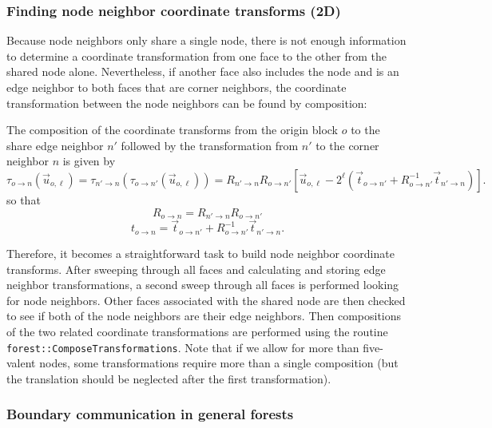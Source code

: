 \documentclass{article}
\begin{document}
\subsubsection{Finding node neighbor coordinate transforms (2D)}
Because node neighbors only share a single node, there is not enough information to determine a coordinate transformation from one face to the other from the shared node alone. Nevertheless, if another face also includes the node and is an edge neighbor to both faces that are corner neighbors, the coordinate transformation between the node neighbors can be found by composition:
\begin{center}

\end{center}
The composition of the coordinate transforms from the origin block $o$ to the share edge neighbor $n'$ followed by the transformation from $n'$ to the corner neighbor $n$ is given by
\begin{equation}
\tau_{o \rightarrow n}(\vec{u}_{o, \ell}) = 
\tau_{n' \rightarrow n}(\tau_{o \rightarrow n'}(\vec{u}_{o, \ell})) = 
R_{n' \rightarrow n} R_{o \rightarrow n'} 
[\vec{u}_{o, \ell} - 2^\ell (\vec{t}_{o \rightarrow n'} + R_{o \rightarrow n'}^{-1}\vec{t}_{n' \rightarrow n})].
\end{equation}
so that 
\begin{equation}
R_{o \rightarrow n} = R_{n' \rightarrow n} R_{o \rightarrow n'} 
\end{equation}
\begin{equation}
t_{o \rightarrow n} = \vec{t}_{o \rightarrow n'} 
+ R_{o \rightarrow n'}^{-1}\vec{t}_{n' \rightarrow n}.
\end{equation}

Therefore, it becomes a straightforward task to build node neighbor coordinate transforms. After sweeping through all faces and calculating and storing edge neighbor transformations, a second sweep through all faces is performed looking for node neighbors. Other faces associated with the shared node are then checked to see if both of the node neighbors are their edge neighbors. Then compositions of the two related coordinate transformations are performed using the routine \texttt{forest::ComposeTransformations}. Note that if we allow for more than five-valent nodes, some transformations require more than a single composition (but the translation should be neglected after the first transformation). 

\subsubsection{Boundary communication in general forests}
\end{document}
